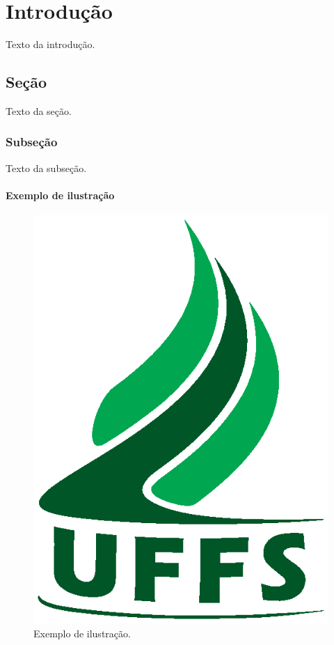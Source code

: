 \chapter{Introdução}

Texto da introdução.

\section{Seção}

Texto da seção.

\subsection{Subseção}

Texto da subseção.

\subsubsection{Exemplo de ilustração}

\begin{figure}[h]
\captionsetup{justification=raggedright, singlelinecheck=false}
\centering
\includegraphics[scale=0.4]{figuras/uffs.eps}
\caption{Exemplo de ilustração.}
\label{fig:uffs}
\end{figure}

